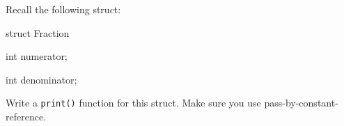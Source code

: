 Recall the following struct:



\begin{consolethree}[escapeinside=||]

struct Fraction

{

    int numerator;

    int denominator;

}

\end{consolethree}



Write a \texttt{print()} function for this struct. Make sure you use pass-by-constant-reference.

